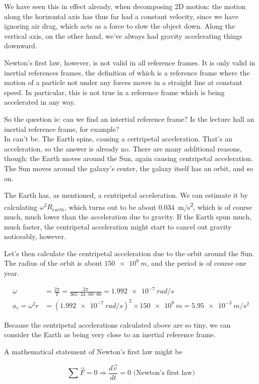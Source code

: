 \documentclass[12pt,a4paper]{report}
\begin{document}
We have seen this in effect already, when decomposing 2D motion: the motion along the horizontal axis has thus far had a constant velocity, since we have ignoring air drag, which acts as a force to slow the object down. Along the vertical axis, on the other hand, we've always had gravity accelerating things downward.

Newton's first law, however, is not valid in all reference frames. It is only valid in inertial references frames, the definition of which is a reference frame where the motion of a particle not under any forces moves in a straight line at constant speed. In particular, this is not true in a reference frame which is being accelerated in any way.

So the question is: can we find an intertial reference frame? Is the lecture hall an inertial reference frame, for example?\\
In can't be. The Earth spins, causing a certripetal acceleration. That's an acceleration, so the answer is already no. There are many additional reasons, though: the Earth moves around the Sun, again causing centripetal acceleration. The Sun moves around the galaxy's center, the galaxy itself has an orbit, and so on.

The Earth has, as mentioned, a centripetal acceleration. We can estimate it by calculating $\omega^2 R_{earth}$, which turns out to be about \SI{0.034}{m/s^2}, which is of course much, much lower than the acceleration due to gravity. If the Earth spun much, much faster, the centripetal acceleration might start to cancel out gravity noticeably, however.

Let's then calculate the centripetal acceleration due to the orbit around the Sun. The radius of the orbit is about $\SI{150e9}{m}$, and the period is of course one year.

\begin{align}
\omega &= \frac{2 \pi}{T} = \frac{2 \pi}{365 \cdot 24 \cdot 60 \cdot 60} = \SI{1.992e-7}{rad/s}\\
a_c = \omega^2 r &= (\SI{1.992e-7}{rad/s})^2 \times \SI{150e9}{m} = \SI{5.95e-3}{m/s^2}
\end{align}

Because the centripetal accelerations calculated above are so tiny, we can consider the Earth as being very close to an inertial reference frame.

A mathematical statement of Newton's first law might be

\begin{equation}
\sum \vec{F} = 0 \Rightarrow \frac{d\vec{v}}{dt} = 0 \text{ (Newton's first law)} \label{eq:newton1}
\end{equation}
\end{document}

